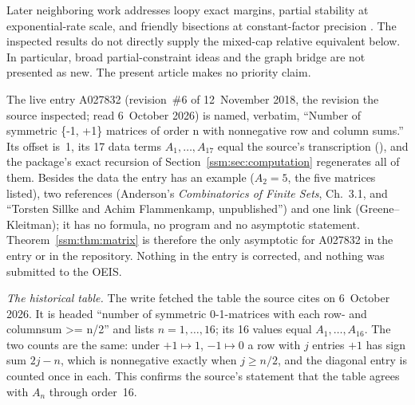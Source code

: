 Later neighboring work addresses loopy exact margins, partial stability at exponential-rate scale, and friendly bisections at constant-factor precision \cite{gm,dgz,mss}. The inspected results do not directly supply the mixed-cap relative equivalent below. In particular, broad partial-constraint ideas and the graph bridge are not presented as new. The present article makes no priority claim.

\begin{remark}\label{ssm:rem:oeis}
The live entry A027832 \cite{oeis} (revision~\#6 of 12~November 2018, the
revision the source inspected; read 6~October 2026) is named, verbatim,
``Number of symmetric \{-1, +1\} matrices of order n with nonnegative row
and column sums.'' Its offset is~1, its 17 data terms $A_1,\ldots,A_{17}$
equal the source's transcription (), and the
package's exact recursion of Section~\ref{ssm:sec:computation} regenerates
all of them. Besides the data the entry has an example ($A_2=5$, the five
matrices listed), two references (Anderson's \emph{Combinatorics of Finite
Sets}, Ch.~3.1, and ``Torsten Sillke and Achim Flammenkamp, unpublished'')
and one link (Greene--Kleitman); it has no formula, no program and no
asymptotic statement. Theorem~\ref{ssm:thm:matrix} is therefore the only
asymptotic for A027832 in the entry or in the repository. Nothing in the
entry is corrected, and nothing was submitted to the OEIS.

\emph{The historical table.} The write fetched the table the source cites
\cite{sf} on 6~October 2026. It is headed ``number of symmetric
0-1-matrices with each row- and columnsum >= n/2'' and lists $n=1,\ldots,16$;
its 16 values equal $A_1,\ldots,A_{16}$. The two counts are the same: under
$+1\mapsto1$, $-1\mapsto0$ a row with $j$ entries $+1$ has sign sum $2j-n$,
which is nonnegative exactly when $j\ge n/2$, and the diagonal entry is
counted once in each. This confirms the source's statement that the table
agrees with $A_n$ through order~16.


\end{remark}
